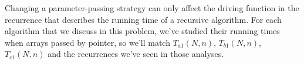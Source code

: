 Changing a parameter-passing strategy can only affect the driving function in the recurrence that describes the running time of a recursive algorithm.
For each algorithm that we discuss in this problem, we've studied their running times when arrays passed by pointer, so we'll match $T_{a1}(N,n)$, $T_{b1}(N,n)$, $T_{c1}(N,n)$ and the recurrences we've seen in those analyses.
